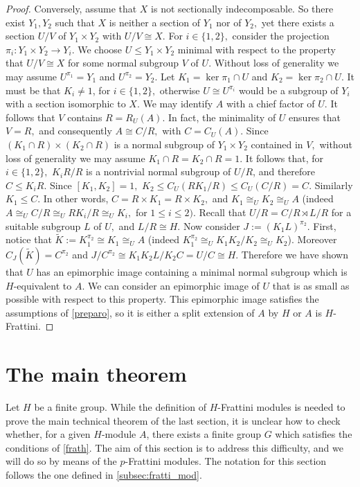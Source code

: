 \documentclass[a4paper,10pt]{amsart}
\theoremstyle{plain}
\theoremstyle{definition}
\begin{document}
\begin{proof}
Conversely, assume that $X$ is not sectionally indecomposable. 
So there exist $Y_1, Y_2$ such that $X$ is neither a section 
of $Y_1$ nor of $Y_2,$ yet there exists a section $U/V$ of 
$Y_1\times Y_2$ with $U/V\cong X.$ For $i\in\{1,2\},$ 
consider the projection $\pi_i\colon Y_1\times Y_2\to Y_i.$ 
We choose $U\leq Y_1\times Y_2$ minimal with respect to 
the property that $U/V\cong X$ for some normal subgroup 
$V$ of $U.$ Without loss of generality we may assume 
$U^{\pi_1}=Y_1$ and $U^{\pi_2}=Y_2.$ Let $K_1=\ker \pi_1\cap U$ 
and $K_2=\ker \pi_2\cap U.$ It must be that $K_i\neq 1$, for $i\in\{1,2\},$
otherwise $U\cong U^{\pi_i}$ would be a subgroup of $Y_i$ with a section isomorphic to $X$.
We may identify $A$ with a chief 
factor of $U$. It follows that $V$ contains $R=R_U(A).$ 
In fact, the minimality of $U$ ensures that $V=R,$ and consequently $A\cong C/R,$ with $C=C_U(A).$
Since $(K_1\cap R)\times (K_2\cap R)$ is a normal subgroup 
of $Y_1\times Y_2$ contained in $V,$ without loss of 
generality we may assume $K_1\cap R=K_2\cap R=1.$ It follows that, for $i\in\{1,2\},$ $K_iR/R$ is a nontrivial normal subgroup of $U/R$, and therefore $C\leq K_iR.$ Since $[K_1,K_2]=1,$
$K_2\leq C_U(RK_1/R)\leq C_U(C/R)=C.$
Similarly $K_1\leq C.$
In other words, $C=R\times K_1=R\times K_2,$ and $K_1\cong_U K_2\cong_U A$
(indeed $A\cong_U C/R \cong_U RK_i/R\cong_U K_i,$ for $1\leq i\leq 2)$.
Recall that $U/R=C/R \rtimes L/R$ for a suitable subgroup $L$ of $U,$ and
$L/R\cong H.$ Now consider $J:=(K_1L)^{\pi_2}.$ First, notice that $\tilde K:=K_1^{\pi_2}\cong K_1\cong_U A$ (indeed $K_1^{\pi_2}\cong_U K_1K_2/K_2\cong_U K_2$). Moreover $C_J(\tilde K)=C^{\pi_2}$ and $J/C^{\pi_2}\cong K_1K_2L/K_2C=U/C\cong H.$
Therefore we have shown that $U$ has an epimorphic image containing a minimal normal subgroup which is $H$-equivalent to $A$. We can consider an epimorphic image of $U$ that is as small as possible with respect to this property. This epimorphic image satisfies the assumptions of \cref{preparo}, so it is either a split extension of $A$ by $H$ or $A$ is $H$-Frattini.
\end{proof}

\section{The main theorem}\label{sec:main}

Let $H$ be a finite group. While the definition of $H$-Frattini modules is needed to prove the main technical theorem of the last section, it is unclear how to check whether, for a given $H$-module $A$, there exists a finite group $G$ which satisfies the conditions of \cref{frath}. The aim of this section is to address this difficulty, and we will do so by means of the $p$-Frattini modules. The notation for this section follows the one defined in \cref{subsec:fratti_mod}.
\end{document}
